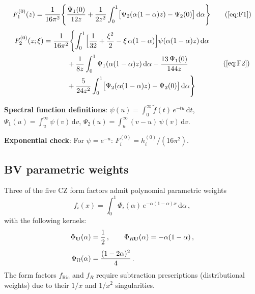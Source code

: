 \documentclass[11pt,a4paper]{article}
\newcommand{\dd}{\mathrm{d}}
\theoremstyle{definition}
\theoremstyle{remark}
\begin{document}
\begin{tcolorbox}[colback=green!5!white,colframe=green!50!black,
  title={\textbf{Scalar spectral action form factors}}]
\begin{equation}
  F_1^{(0)}(z)
  = \frac{1}{16\pi^2}\Biggl\{
    \frac{\Psi_1(0)}{12z}
    + \frac{1}{2z^2}\int_0^1
      \bigl[\Psi_2(\alpha(1-\alpha)z) - \Psi_2(0)\bigr]
      \,\dd\alpha
  \Biggr\}
  \tag{\ref{eq:F1}}
\end{equation}
\begin{equation}
  \begin{aligned}
  F_2^{(0)}(z;\xi)
  &= \frac{1}{16\pi^2}\Biggl\{
    \int_0^1
    \Bigl[\frac{1}{32} + \frac{\xi^2}{2}
    - \xi\,\alpha(1-\alpha)\Bigr]
    \psi(\alpha(1-\alpha)z)\,\dd\alpha\\
  &\quad\quad\quad\;
    + \frac{1}{8z}\int_0^1
      \Psi_1(\alpha(1-\alpha)z)\,\dd\alpha
    - \frac{13\,\Psi_1(0)}{144z}\\
  &\quad\quad\quad\;
    + \frac{5}{24z^2}\int_0^1
      \bigl[\Psi_2(\alpha(1-\alpha)z) - \Psi_2(0)\bigr]
      \,\dd\alpha
  \Biggr\}
  \end{aligned}
  \tag{\ref{eq:F2}}
\end{equation}

\textbf{Spectral function definitions}:
$\psi(u) = \int_0^\infty \tilde{f}(t)\,e^{-tu}\,\dd t$,
\;$\Psi_1(u) = \int_u^\infty \psi(v)\,\dd v$,
\;$\Psi_2(u) = \int_u^\infty (v-u)\,\psi(v)\,\dd v$.

\textbf{Exponential check}: For $\psi = e^{-u}$:
$F_i^{(0)} = h_i^{(0)}/(16\pi^2)$.
\end{tcolorbox}


\subsection{BV parametric weights}

Three of the five CZ form factors admit polynomial parametric
weights
\begin{equation*}
  f_i(x) = \int_0^1 \Phi_i(\alpha)\,e^{-\alpha(1-\alpha)x}\,\dd\alpha\,,
\end{equation*}
with the following kernels:
\begin{align}
  \Phi_{\mathbf{U}}(\alpha) &= \frac{1}{2}\,,\qquad
  \Phi_{R\mathbf{U}}(\alpha) = -\alpha(1-\alpha)\,,\notag\\[4pt]
  \Phi_\Omega(\alpha) &= \frac{(1-2\alpha)^2}{4}\,.
  \label{eq:BV-weights}
\end{align}
The form factors $f_{\text{Ric}}$ and $f_R$ require subtraction
prescriptions (distributional weights) due to their $1/x$ and $1/x^2$
singularities.
\end{document}
